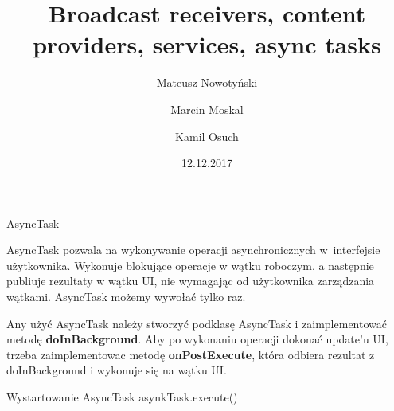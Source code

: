 \documentclass{beamer}
\title[Technologie mobilne]{Broadcast receivers, content providers, services, async tasks}
\author[M. Nowotyński, M.Moskal, K. Osuch]{Mateusz Nowotyński \and Marcin Moskal \and Kamil Osuch}
\date[12.12.2017]{12.12.2017}
\begin{document}
{
 \begin{frame}
   \titlepage
 \end{frame}
}


\begin{frame}{AsyncTask}
	\begin{block}{}
		AsyncTask pozwala na wykonywanie operacji asynchronicznych w~interfejsie użytkownika. Wykonuje blokujące operacje w wątku roboczym, a następnie publiuje rezultaty w wątku UI, nie wymagając od użytkownika zarządzania wątkami. AsyncTask możemy wywołać tylko raz.
	\end{block}
	
	\begin{block}{}
		Any użyć AsyncTask należy stworzyć podklasę AsyncTask i zaimplementować metodę \textbf{doInBackground}. Aby po wykonaniu operacji dokonać update'u UI, trzeba zaimplementowac metodę \textbf{onPostExecute}, która odbiera rezultat z doInBackground i wykonuje się na wątku UI.
	\end{block}
	
	\begin{block}{Wystartowanie AsyncTask}
		asynkTask.execute()
	\end{block}
\end{frame}
\end{document}

